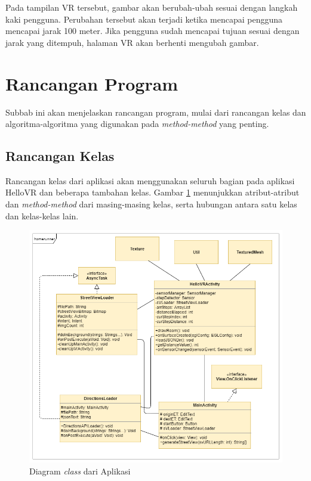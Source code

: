 Pada tampilan VR tersebut, gambar akan berubah-ubah sesuai dengan langkah kaki pengguna. Perubahan tersebut akan terjadi ketika mencapai pengguna mencapai jarak 100 meter. Jika pengguna sudah mencapai tujuan sesuai dengan jarak yang ditempuh, halaman VR akan berhenti mengubah gambar.     

\section{Rancangan Program}
Subbab ini akan menjelaskan rancangan  program, mulai dari rancangan kelas dan algoritma-algoritma yang digunakan pada \textit{method-method} yang penting. 

\subsection{Rancangan Kelas}
Rancangan kelas dari aplikasi akan menggunakan seluruh bagian pada aplikasi HelloVR dan beberapa tambahan kelas. Gambar \ref{fig:class-diagram} menunjukkan atribut-atribut dan \textit{method-method} dari masing-masing kelas, serta hubungan antara satu kelas dan kelas-kelas lain. 

\begin{figure}[h]
	\centering
		\includegraphics[scale=0.6]{Gambar/class-diagram.png}
	\caption{Diagram \textit{class} dari Aplikasi}
	\label{fig:class-diagram}
\end{figure}

